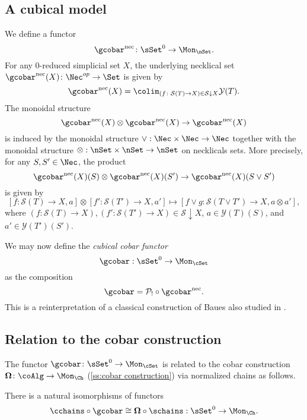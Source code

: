 \subsection{A cubical model}

We define a functor 
$$\gcobar^{\text{nec}} \colon \sSet^0 \to \Mon_{\nSet}.$$
For any $0$-reduced simplicial set $X$, the underlying necklical set $\gcobar^{\text{nec}}(X) \colon \Nec^{op} \to \Set$ is given by
$$\gcobar^{\text{nec}}(X) = \colim_{(f \colon \mathcal{S}(T) \to X) \in  \mathcal{S} \downarrow X} \mathcal{Y}(T).$$
The monoidal structure $$\gcobar^{\text{nec}}(X) \otimes \gcobar^{\text{nec}}(X) \to \gcobar^{\text{nec}}(X)$$
is induced by the monoidal structure $\vee: \Nec \times \Nec \to \Nec$ together with the monoidal structure $\otimes: \nSet \times \nSet \to \nSet$ on necklicals sets. More precisely, for any $S, S' \in \Nec$, the product $$\gcobar^{\text{nec}}(X)(S) \otimes \gcobar^{\text{nec}}(X)(S') \to \gcobar^{\text{nec}}(X)(S \vee S')$$ is given by $$[f\colon \mathcal{S}(T) \to X, a] \otimes [f'\colon \mathcal{S}(T') \to X, a'] \mapsto [f \vee g\colon \mathcal{S}(T\vee T') \to X, a \otimes  a'],$$
where $(f\colon \mathcal{S}(T) \to X), (f'\colon \mathcal{S}(T') \to X) \in \mathcal{S} \downarrow X$, $a\in \mathcal{Y}(T)(S)$, and $a'\in \mathcal{Y}(T')(S')$.

We may now define the \textit{cubical cobar functor} $$\gcobar: \sSet^0 \to \Mon_{\cSet}$$ as the composition $$\gcobar= \mathcal{P}_! \circ \gcobar^{\text{nec}}.$$ This is a reinterpretation of a classical construction of Baues \cite{baues1998hopf} also studied in \cite{rivera2018cubical}. 

\subsection{Relation to the cobar construction}

The functor $\gcobar\colon \sSet^0 \to \Mon_{\cSet}$ is related to the cobar construction $\mathbf{\Omega} \colon \coAlg \to \Mon_{\Ch}$ (\cref{ss:cobar construction}) via normalized chains as follows.

\begin{proposition} \label{gcobarandcobar}
There is a natural isomorphisms of functors 
$$\cchains \circ \gcobar \cong \mathbf{\Omega} \circ \schains: \sSet^0 \to \Mon_{\Ch}.$$
\end{proposition}

